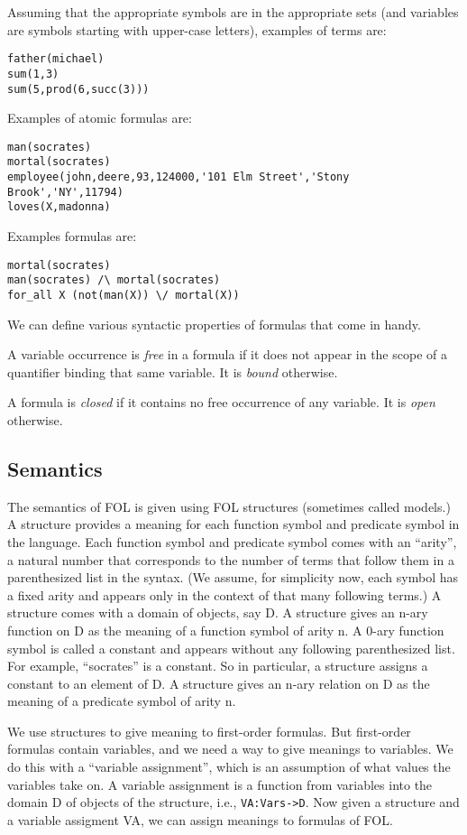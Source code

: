 Assuming that the appropriate symbols are in the appropriate sets (and
variables are symbols starting with upper-case letters), examples of
terms are:
\begin{verbatim}
father(michael)
sum(1,3)
sum(5,prod(6,succ(3)))
\end{verbatim}
Examples of atomic formulas are:
\begin{verbatim}
man(socrates)
mortal(socrates)
employee(john,deere,93,124000,'101 Elm Street','Stony Brook','NY',11794)
loves(X,madonna)
\end{verbatim}
Examples formulas are:
\begin{verbatim}
mortal(socrates)
man(socrates) /\ mortal(socrates)
for_all X (not(man(X)) \/ mortal(X))
\end{verbatim}

We can define various syntactic properties of formulas that come in
handy.  

A variable occurrence is {\em free} in a formula if it does not appear
in the scope of a quantifier binding that same variable.  It is {\em
bound} otherwise.

A formula is {\em closed} if it contains no free occurrence of any
variable.  It is {\em open} otherwise.

\subsection{Semantics}

The semantics of FOL is given using FOL structures (sometimes called
models.)  A structure provides a meaning for each function symbol and
predicate symbol in the language.  Each function symbol and predicate
symbol comes with an ``arity'', a natural number that corresponds to
the number of terms that follow them in a parenthesized list in the
syntax.  (We assume, for simplicity now, each symbol has a fixed arity
and appears only in the context of that many following terms.)  A
structure comes with a domain of objects, say D.  A structure gives an
n-ary function on D as the meaning of a function symbol of arity n.  A
0-ary function symbol is called a constant and appears without any
following parenthesized list.  For example, ``socrates'' is a
constant.  So in particular, a structure assigns a constant to an
element of D.  A structure gives an n-ary relation on D as the meaning
of a predicate symbol of arity n.

We use structures to give meaning to first-order formulas.  But
first-order formulas contain variables, and we need a way to give
meanings to variables.  We do this with a ``variable assignment'', which
is an assumption of what values the variables take on.  A variable
assignment is a function from variables into the domain D of objects
of the structure, i.e., \verb|VA:Vars->D|.  Now given a structure and a
variable assigment VA, we can assign meanings to formulas of FOL.

